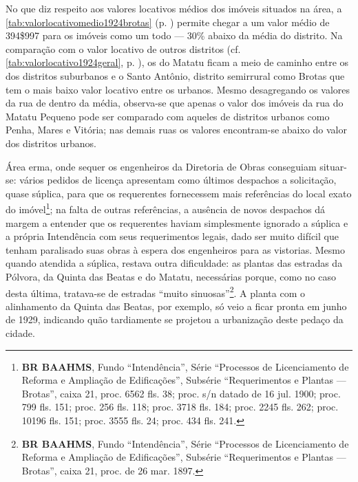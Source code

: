 No que diz respeito aos valores locativos médios dos imóveis situados na área, a \autoref{tab:valorlocativomedio1924brotas} (p. \pageref{tab:valorlocativomedio1924brotas}) permite chegar a um valor médio de 394\$997 para os imóveis como um todo --- 30\% abaixo da média do distrito. Na comparação com o valor locativo de outros distritos (cf. \autoref{tab:valorlocativo1924geral}, p. \pageref{tab:valorlocativo1924geral}), os do Matatu ficam a meio de caminho entre os dos distritos suburbanos e o Santo Antônio, distrito semirrural como Brotas que tem o mais baixo valor locativo entre os urbanos. Mesmo desagregando os valores da rua de dentro da média, observa-se que apenas o valor dos imóveis da rua do Matatu Pequeno pode ser comparado com aqueles de distritos urbanos como Penha, Mares e Vitória; nas demais ruas os valores encontram-se abaixo do valor dos distritos urbanos.





Área erma, onde sequer os engenheiros da Diretoria de Obras conseguiam situar-se: vários pedidos de licença apresentam como últimos despachos a solicitação, quase súplica, para que os requerentes fornecessem mais referências do local exato do imóvel\footnote{\textbf{BR BAAHMS}, Fundo ``Intendência'', Série ``Processos de Licenciamento de Reforma e Ampliação de Edificações'', Subsérie ``Requerimentos e Plantas --- Brotas'', caixa 21, proc. 6562 fls. 38; proc. s/n datado de 16 jul. 1900; proc. 799 fls. 151; proc. 256 fls. 118; proc. 3718 fls. 184; proc. 2245 fls. 262; proc. 10196 fls. 151; proc. 3555 fls. 24; proc. 434 fls. 241.}; na falta de outras referências, a ausência de novos despachos dá margem a entender que os requerentes haviam simplesmente ignorado a súplica e a própria Intendência com seus requerimentos legais, dado ser muito difícil que tenham paralisado suas obras à espera dos engenheiros para as vistorias. Mesmo quando atendida a súplica, restava outra dificuldade: as plantas das estradas da Pólvora, da Quinta das Beatas e do Matatu, necessárias porque, como no caso desta última, tratava-se de estradas ``muito sinuosas''\footnote{\textbf{BR BAAHMS}, Fundo ``Intendência'', Série ``Processos de Licenciamento de Reforma e Ampliação de Edificações'', Subsérie ``Requerimentos e Plantas --- Brotas'', caixa 21, proc. de 26 mar. 1897.}. A planta com o alinhamento da Quinta das Beatas, por exemplo, só veio a ficar pronta em junho de 1929, indicando quão tardiamente se projetou a urbanização deste pedaço da cidade.

